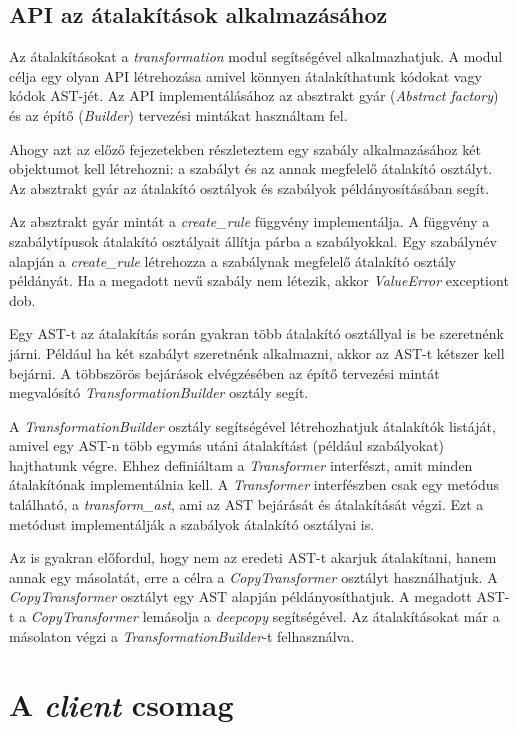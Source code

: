 \subsection{API az átalakítások alkalmazásához}

Az átalakításokat a \emph{transformation} modul segítségével alkalmazhatjuk.
A modul célja egy olyan API létrehozása amivel könnyen átalakíthatunk kódokat vagy kódok AST-jét.
Az API implementálásához az absztrakt gyár (\emph{Abstract factory}) és az építő (\emph{Builder})
tervezési mintákat használtam fel.

Ahogy azt az előző fejezetekben részleteztem
egy szabály alkalmazásához két objektumot kell létrehozni:
a szabályt és az annak megfelelő átalakító osztályt.
Az absztrakt gyár az átalakító osztályok és szabályok példányosításában segít.

Az absztrakt gyár mintát a \emph{create\_rule} függvény implementálja.
A függvény a szabálytípusok átalakító osztályait állítja párba a szabályokkal.
Egy szabálynév alapján a \emph{create\_rule} létrehozza
a szabálynak megfelelő átalakító osztály példányát.
Ha a megadott nevű szabály nem létezik, akkor \emph{ValueError} exceptiont dob.

Egy AST-t az átalakítás során gyakran több átalakító osztállyal is be szeretnénk járni.
Például ha két szabályt szeretnénk alkalmazni, akkor az AST-t kétszer kell bejárni.
A többszörös bejárások elvégzésében az építő tervezési mintát megvalósító
\emph{TransformationBuilder} osztály segít.

A \emph{TransformationBuilder} osztály segítségével
létrehozhatjuk átalakítók listáját, amivel egy AST-n több egymás utáni átalakítást
(például szabályokat) hajthatunk végre.
Ehhez definiáltam a \emph{Transformer} interfészt, amit minden átalakítónak
implementálnia kell.
A \emph{Transformer} interfészben csak egy metódus található, a \emph{transform\_ast},
ami az AST bejárását és átalakítását végzi.
Ezt a metódust implementálják a szabályok átalakító osztályai is.

Az is gyakran előfordul, hogy nem az eredeti AST-t akarjuk átalakítani, hanem annak egy másolatát,
erre a célra a \emph{CopyTransformer} osztályt használhatjuk.
A \emph{CopyTransformer} osztályt egy AST alapján példányosíthatjuk.
A megadott AST-t a \emph{CopyTransformer} lemásolja a \emph{deepcopy} segítségével.
Az átalakításokat már a másolaton végzi a \emph{TransformationBuilder}-t felhasználva.

\pagebreak

\section{A \emph{client} csomag}

